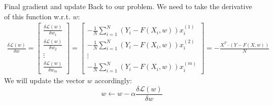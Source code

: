 \bgroup
\begin{frame}{Final gradient and update}
Back to our problem. We need to take the derivative of this function w.r.t. $w$:
\begin{align*}
\frac{\delta \mathcal{L}(w)}{\delta w} = \begin{bmatrix}
\frac{\delta \mathcal{L}(w)}{\delta w_1}\\[1em]
\frac{\delta \mathcal{L}(w)}{\delta w_2}\\[1em]
\vdots\\[1em]
\frac{\delta \mathcal{L}(w)}{\delta w_m}
\end{bmatrix} = 
\begin{bmatrix}
-\frac{1}{N} \sum_{i=1}^N (Y_i - F(X_i, w))x_i^{(1)}\\[1em]
-\frac{1}{N} \sum_{i=1}^N (Y_i - F(X_i, w))x_i^{(2)}\\[1em]
\vdots\\[1em]
-\frac{1}{N} \sum_{i=1}^N (Y_i - F(X_i, w))x_i^{(m)}
\end{bmatrix} = -\frac{X^T \cdot (Y-F(X,w))}{N}
\end{align*}
We will update the vector $w$ accordingly:
\begin{equation*}
w \leftarrow w - \alpha\frac{\delta \mathcal{L}(w)}{\delta w}
\end{equation*}
\end{frame}
\egroup